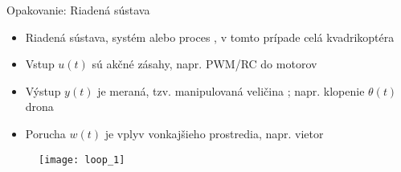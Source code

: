 %
%
%


%


\begin{frame}{Opakovanie: Riadená sústava}
  \begin{itemize}
    \item<1-> Riadená sústava, systém alebo proces , v tomto prípade celá kvadrikoptéra
    \item<2-> Vstup $u(t)$  sú akčné zásahy, napr. PWM/RC do motorov
    \item<3-> Výstup $y(t)$  je meraná, tzv. manipulovaná veličina ; napr. klopenie $\theta(t)$ drona
    \item<4-> Porucha  $w(t)$ je vplyv vonkajšieho prostredia, napr. vietor
  \end{itemize}

\begin{figure}
\centering
  \texttt{[image: loop\_1]}\\
\end{figure}
\end{frame}


